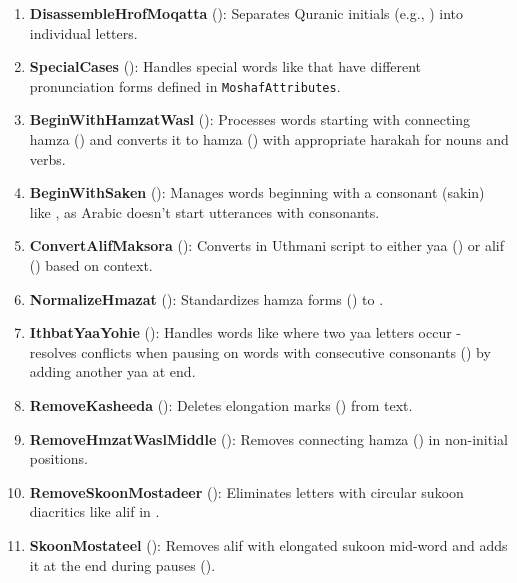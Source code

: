 \begin{enumerate}
    \item \textbf{DisassembleHrofMoqatta} (): Separates Quranic initials (e.g., ) into individual letters.
    
    \item \textbf{SpecialCases} (): Handles special words like  that have different pronunciation forms defined in \texttt{MoshafAttributes}.
    
    \item \textbf{BeginWithHamzatWasl} (): Processes words starting with connecting hamza () and converts it to hamza () with appropriate harakah for nouns and verbs.
    
    \item \textbf{BeginWithSaken} (): Manages words beginning with a consonant (sakin) like , as Arabic doesn't start utterances with consonants.
    
    \item \textbf{ConvertAlifMaksora} (): Converts  in Uthmani script to either yaa () or alif () based on context.
    
    \item \textbf{NormalizeHmazat} (): Standardizes hamza forms () to .
    
    \item \textbf{IthbatYaaYohie} (): Handles words like  where two yaa letters occur - resolves conflicts when pausing on words with consecutive consonants () by adding another yaa at end.
    
    \item \textbf{RemoveKasheeda} (): Deletes elongation marks () from text.
    
    \item \textbf{RemoveHmzatWaslMiddle} (): Removes connecting hamza () in non-initial positions.
    
    \item \textbf{RemoveSkoonMostadeer} (): Eliminates letters with circular sukoon diacritics like alif in .
    
    \item \textbf{SkoonMostateel} (): Removes alif with elongated sukoon mid-word and adds it at the end during pauses ().
    

\end{enumerate}
